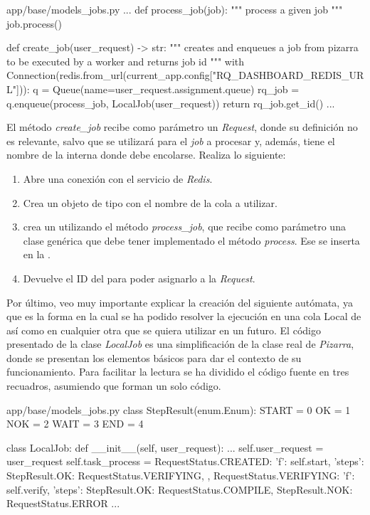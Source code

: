 \documentclass[11pt,spanish,listoffigures,listoftables]{tfgetsinf}
\begin{document}
\begin{code}{app/base/models\_jobs.py}
...
def process_job(job):
	"""
	process a given job
	"""
	job.process()

def create_job(user_request) -> str:
	"""
	creates and enqueues a job from pizarra to be executed by a worker and returns job id
	"""
	with Connection(redis.from_url(current_app.config["RQ_DASHBOARD_REDIS_URL"])):
	q = Queue(name=user_request.assignment.queue)
	rq_job = q.enqueue(process_job, LocalJob(user_request))
	return rq_job.get_id()
...
\end{code}

El método \textit{create\_job} recibe como parámetro un \textit{Request}, donde su definición no es relevante, salvo que se utilizará para el \textit{job} a procesar y, además, tiene el nombre de la  interna donde debe encolarse. Realiza lo siguiente:

\begin{enumerate}
	\item Abre una conexión con el servicio de \textit{Redis}.
	\item Crea un objeto de tipo  con el nombre de la \gls{cola} a utilizar.
	\item crea un  utilizando el método \textit{process\_job}, que recibe como parámetro una clase genérica que debe tener implementado el método \textit{process}. Ese  se inserta en la .
	\item Devuelve el ID del  para poder asignarlo a la \textit{Request}.
\end{enumerate}

Por último, veo muy importante explicar la creación del siguiente autómata, ya que es la forma en la cual se ha podido resolver la ejecución en una \gls{cola} Local de \kahan así como en cualquier otra que se quiera utilizar en un futuro. El código presentado de la clase \textit{LocalJob} es una simplificación de la clase real de \textit{Pizarra}, donde se presentan los elementos básicos para dar el contexto de su funcionamiento.
Para facilitar la lectura se ha dividido el código fuente en tres recuadros, asumiendo que forman un solo código.

\begin{code}{app/base/models\_jobs.py}
class StepResult(enum.Enum):
	START = 0
	OK = 1
	NOK = 2
	WAIT = 3
	END = 4
	
class LocalJob:
	def __init__(self, user_request):
		...
		self.user_request = user_request
		self.task_process = {
			RequestStatus.CREATED: {
				'f': self.start,
				'steps': {
					StepResult.OK: RequestStatus.VERIFYING,
				}
			},
			RequestStatus.VERIFYING: {
				'f': self.verify,
				'steps': {
					StepResult.OK: RequestStatus.COMPILE,
					StepResult.NOK: RequestStatus.ERROR
				}
			}
			...
		}
	
\end{code}
\end{document}

